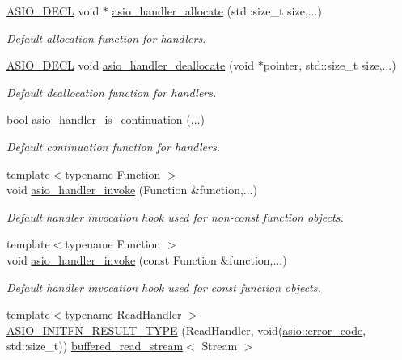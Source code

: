 \begin{DoxyCompactItemize}
\hyperlink{config_8hpp_ab54d01ea04afeb9a8b39cfac467656b7}{A\+S\+I\+O\+\_\+\+D\+E\+C\+L} void $\ast$ \hyperlink{namespaceasio_a825c2034d7e4609cb65e53ec2cf833bf}{asio\+\_\+handler\+\_\+allocate} (std\+::size\+\_\+t size,...)
\begin{DoxyCompactList}\small\item\em Default allocation function for handlers. \end{DoxyCompactList}\item 
\hyperlink{config_8hpp_ab54d01ea04afeb9a8b39cfac467656b7}{A\+S\+I\+O\+\_\+\+D\+E\+C\+L} void \hyperlink{namespaceasio_a1316007445a73023bc5603a69c97d9b7}{asio\+\_\+handler\+\_\+deallocate} (void $\ast$pointer, std\+::size\+\_\+t size,...)
\begin{DoxyCompactList}\small\item\em Default deallocation function for handlers. \end{DoxyCompactList}\item 
bool \hyperlink{namespaceasio_a7613e3b437b2491c154e056f1a26668f}{asio\+\_\+handler\+\_\+is\+\_\+continuation} (...)
\begin{DoxyCompactList}\small\item\em Default continuation function for handlers. \end{DoxyCompactList}\item 
{\footnotesize template$<$typename Function $>$ }\\void \hyperlink{group__asio__handler__invoke_ga91c8e702816572ffb691ca3f60a27871}{asio\+\_\+handler\+\_\+invoke} (Function \&function,...)
\begin{DoxyCompactList}\small\item\em Default handler invocation hook used for non-\/const function objects. \end{DoxyCompactList}\item 
{\footnotesize template$<$typename Function $>$ }\\void \hyperlink{group__asio__handler__invoke_gabe759a0b25886ffc0b10ecd98bb69edd}{asio\+\_\+handler\+\_\+invoke} (const Function \&function,...)
\begin{DoxyCompactList}\small\item\em Default handler invocation hook used for const function objects. \end{DoxyCompactList}\item 
{\footnotesize template$<$typename Read\+Handler $>$ }\\\hyperlink{namespaceasio_a461c3a69a56dac355730dd6bbddf4ec3}{A\+S\+I\+O\+\_\+\+I\+N\+I\+T\+F\+N\+\_\+\+R\+E\+S\+U\+L\+T\+\_\+\+T\+Y\+P\+E} (Read\+Handler, void(\hyperlink{classasio_1_1error__code}{asio\+::error\+\_\+code}, std\+::size\+\_\+t)) \hyperlink{classasio_1_1buffered__read__stream}{buffered\+\_\+read\+\_\+stream}$<$ Stream $>$

\end{DoxyCompactItemize}
